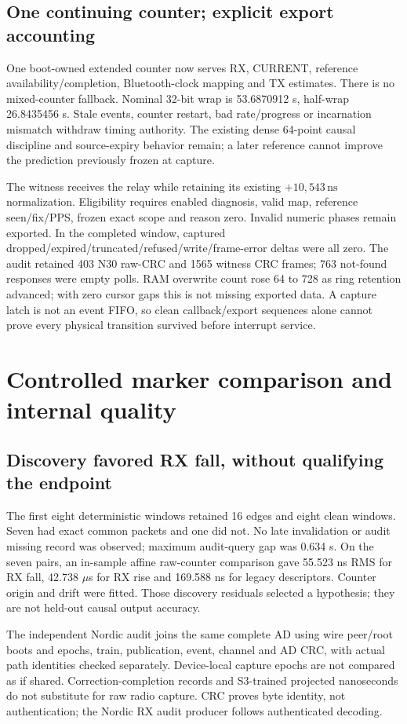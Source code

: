 \documentclass[10pt,letterpaper]{article}
\newcommand{\ns}{\,\mathrm{ns}}\newcommand{\us}{\,\mu\mathrm{s}}\newcommand{\code}[1]{\texttt{#1}}\newcolumntype{L}[1]{>{\RaggedRight\arraybackslash}p{#1}}\renewcommand{\arraystretch}{1.15}
\begin{document}
\subsection{One continuing counter; explicit export accounting}
One boot-owned extended counter now serves RX, CURRENT, reference availability/completion, Bluetooth-clock mapping and TX estimates. There is no mixed-counter fallback. Nominal 32-bit wrap is 53.6870912 s, half-wrap 26.8435456 s. Stale events, counter restart, bad rate/progress or incarnation mismatch withdraw timing authority. The existing dense 64-point causal discipline and source-expiry behavior remain; a later reference cannot improve the prediction previously frozen at capture.

The witness receives the relay while retaining its existing $+10{,}543\ns$ normalization. Eligibility requires enabled diagnosis, valid map, reference seen/fix/PPS, frozen exact scope and reason zero. Invalid numeric phases remain exported. In the completed window, captured dropped/expired/truncated/refused/write/frame-error deltas were all zero. The audit retained 403 N30 raw-CRC and 1565 witness CRC frames; 763 not-found responses were empty polls. RAM overwrite count rose 64 to 728 as ring retention advanced; with zero cursor gaps this is not missing exported data. A capture latch is not an event FIFO, so clean callback/export sequences alone cannot prove every physical transition survived before interrupt service.
\newpage

\section{Controlled marker comparison and internal quality}\label{sec:controlled}
\subsection{Discovery favored RX fall, without qualifying the endpoint}
The first eight deterministic windows retained 16 edges and eight clean windows. Seven had exact common packets and one did not. No late invalidation or audit missing record was observed; maximum audit-query gap was 0.634 s. On the seven pairs, an in-sample affine raw-counter comparison gave 55.523 ns RMS for RX fall, 42.738 $\mu$s for RX rise and 169.588 ns for legacy descriptors. Counter origin and drift were fitted. Those discovery residuals selected a hypothesis; they are not held-out causal output accuracy.

The independent Nordic audit joins the same complete AD using wire peer/root boots and epochs, train, publication, event, channel and AD CRC, with actual path identities checked separately. Device-local capture epochs are not compared as if shared. Correction-completion records and S3-trained projected nanoseconds do not substitute for raw radio capture. CRC proves byte identity, not authentication; the Nordic RX audit producer follows authenticated decoding.
\end{document}
